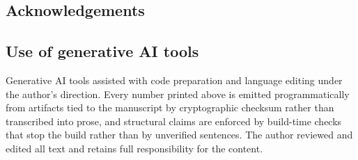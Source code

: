 \ifdefined\DRAFTTODO
\subsection*{Acknowledgements}

\fi

\subsection*{Use of generative AI tools}

Generative AI tools assisted with code preparation and language editing under
the author's direction. Every number printed above is emitted programmatically
from artifacts tied to the manuscript by cryptographic checksum rather than
transcribed into prose, and structural claims are enforced by build-time checks
that stop the build rather than by unverified sentences. The author reviewed and
edited all text and retains full responsibility for the content.
